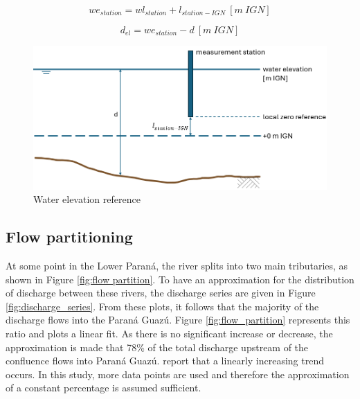 \begin{equation}
    we_{station} = wl_{station} + l_{station-IGN} ~[m~IGN]
\end{equation}

\begin{equation}
    d_{el} = we_{station}-d ~[m~IGN]
\end{equation}


\begin{figure}[H]
    \centering
    \includegraphics[width=0.75\linewidth]{figures/ch5/waterelevations.png}
    \caption{Water elevation reference}
    \label{fig:waterelevationreference}
\end{figure}

\subsection{Flow partitioning}

At some point in the Lower Paraná, the river splits into two main tributaries, as shown in Figure \ref{fig:flow partition}. To have an approximation for the distribution of discharge between these rivers, the discharge series are given in Figure \ref{fig:discharge_series}. From these plots, it follows that the majority of the discharge flows into the Paraná Guazú. Figure \ref{fig:flow_partition} represents this ratio and plots a linear fit. As there is no significant increase or decrease, the approximation is made that 78\% of the total discharge upstream of the confluence flows into Paraná Guazú. \citeauthor{reMETODOLOGIAPARAGENERACION2009} report that a linearly increasing trend occurs. In this study, more data points are used and therefore the approximation of a constant percentage is assumed sufficient. 

